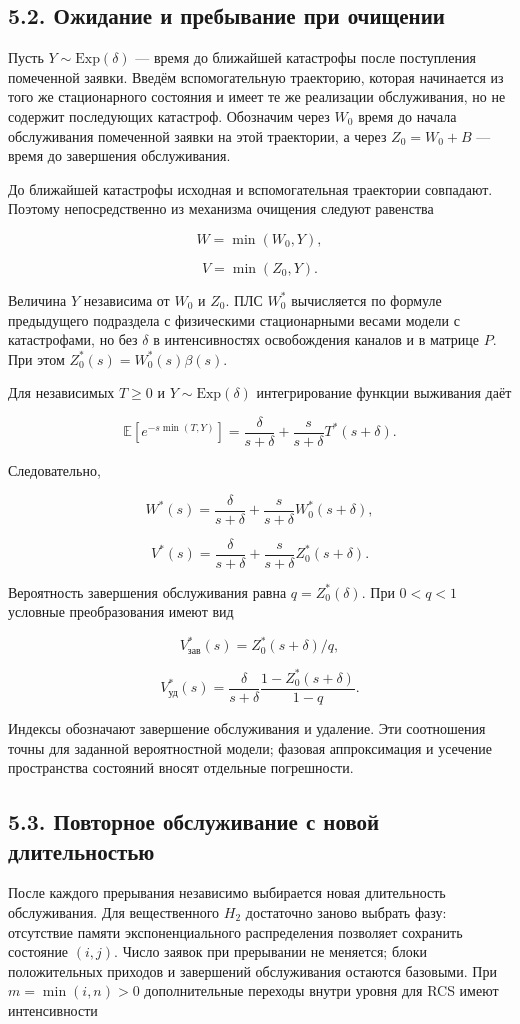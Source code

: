 \subsection*{5.2. Ожидание и пребывание при очищении}
Пусть \(Y\sim\mathrm{Exp}(\delta)\) --- время до ближайшей катастрофы после поступления помеченной заявки. Введём вспомогательную траекторию, которая начинается из того же стационарного состояния и имеет те же реализации обслуживания, но не содержит последующих катастроф. Обозначим через \(W_0\) время до начала обслуживания помеченной заявки на этой траектории, а через \(Z_0=W_0+B\) --- время до завершения обслуживания.

До ближайшей катастрофы исходная и вспомогательная траектории совпадают. Поэтому непосредственно из механизма очищения следуют равенства


\[W=\min(W_0,Y),\]

\[V=\min(Z_0,Y).\]


Величина \(Y\) независима от \(W_0\) и \(Z_0.\) ПЛС \(W_0^*\) вычисляется по формуле предыдущего подраздела с физическими стационарными весами модели с катастрофами, но без \(\delta\) в интенсивностях освобождения каналов и в матрице \(P.\) При этом \(Z_0^*(s)=W_0^*(s)\beta(s).\)

Для независимых \(T\ge0\) и \(Y\sim\mathrm{Exp}(\delta)\) интегрирование функции выживания даёт


\[\mathbb E[e^{-s\min(T,Y)}]=\frac{\delta}{s+\delta}+\frac{s}{s+\delta}T^*(s+\delta).\]


Следовательно,


\[W^*(s)=\frac{\delta}{s+\delta}+\frac{s}{s+\delta}W_0^*(s+\delta),\]

\[V^*(s)=\frac{\delta}{s+\delta}+\frac{s}{s+\delta}Z_0^*(s+\delta).\]


Вероятность завершения обслуживания равна \(q=Z_0^*(\delta).\) При \(0<q<1\) условные преобразования имеют вид


\[V_{\text{зав}}^*(s)=Z_0^*(s+\delta)/q,\]

\[V_{\text{уд}}^*(s)=\frac{\delta}{s+\delta}\frac{1-Z_0^*(s+\delta)}{1-q}.\]


Индексы обозначают завершение обслуживания и удаление. Эти соотношения точны для заданной вероятностной модели; фазовая аппроксимация и усечение пространства состояний вносят отдельные погрешности.

\subsection*{5.3. Повторное обслуживание с новой длительностью}
После каждого прерывания независимо выбирается новая длительность обслуживания. Для вещественного \(H_2\) достаточно заново выбрать фазу: отсутствие памяти экспоненциального распределения позволяет сохранить состояние \((i,j).\) Число заявок при прерывании не меняется; блоки положительных приходов и завершений обслуживания остаются базовыми. При \(m=\min(i,n)>0\) дополнительные переходы внутри уровня для RCS имеют интенсивности



